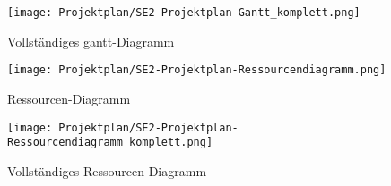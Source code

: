\documentclass{scrreprt}
\begin{document}
\clearpage
\begin{figure}[!ht]
\centering
\texttt{[image: Projektplan/SE2-Projektplan-Gantt\_komplett.png]}
\caption{Vollständiges gantt-Diagramm}
\end{figure}

\clearpage
\begin{figure}[!ht]
\centering
\texttt{[image: Projektplan/SE2-Projektplan-Ressourcendiagramm.png]}
\caption{Ressourcen-Diagramm}
\end{figure}

\clearpage
\begin{figure}[!ht]
\centering
\texttt{[image: Projektplan/SE2-Projektplan-Ressourcendiagramm\_komplett.png]}
\caption{Vollständiges Ressourcen-Diagramm}
\end{figure}
\end{document}
